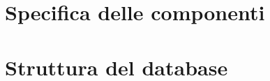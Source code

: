 \section{Specifica delle componenti}
\label{sec:Specifica delle componenti}



\section{Struttura del database}
\label{sub:Struttura del database}


